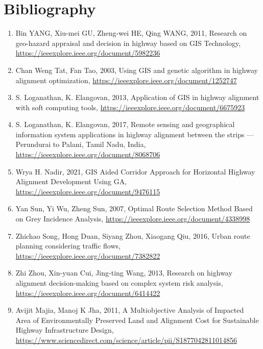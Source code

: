 %


\chapter{Bibliography}
\begin{enumerate}
  \item Bin YANG, Xiu-mei GU, Zheng-wei HE, Qing WANG, 2011, Research on geo-hazard appraisal and decision in highway based on GIS Technology, \url{https://ieeexplore.ieee.org/document/5982236}
\item Chan Weng Tat, Fan Tao, 2003, Using GIS and genetic algorithm in highway alignment optimization, \url{https://ieeexplore.ieee.org/document/1252747}
\item S. Loganathan, K. Elangovan, 2013, Application of GIS in highway alignment with soft computing tools, \url{https://ieeexplore.ieee.org/document/6675923}
\item S. Loganathan, K. Elangovan, 2017, Remote sensing and geographical information system applications in highway alignment between the strips — Perundurai to Palani, Tamil Nadu, India, \url{https://ieeexplore.ieee.org/document/8068706}
\item Wrya H. Nadir, 2021, GIS Aided Corridor Approach for Horizontal Highway Alignment Development Using GA, \url{https://ieeexplore.ieee.org/document/9476115}
\item Yan Sun, Yi Wu, Zheng Sun, 2007, Optimal Route Selection Method Based on Grey Incidence Analysis, \url{https://ieeexplore.ieee.org/document/4338998}
\item Zhichao Song, Hong Duan, Siyang Zhou, Xiaogang Qiu, 2016, Urban route planning considering traffic flows, \url{https://ieeexplore.ieee.org/document/7382822}
\item Zhi Zhou, Xin-yuan Cui, Jing-ting Wang, 2013, Research on highway alignment decision-making based on complex system risk analysis, \url{https://ieeexplore.ieee.org/document/6414422}
\item Avijit Majia, Manoj K Jha, 2011, A Multiobjective Analysis of Impacted Area of Environmentally Preserved Land and Alignment Cost for Sustainable Highway Infrastructure Design, \url{https://www.sciencedirect.com/science/article/pii/S1877042811014856} 

\end{enumerate}
